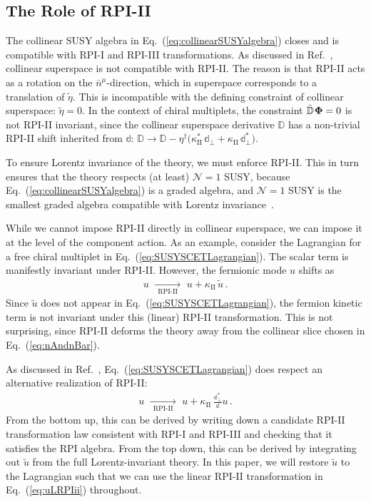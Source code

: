 \documentclass[12pt,document,nofootinbib,superscriptaddress,onecolumn,preprintnumbers,balancelastpage]{article}
\newcommand{\rpiii}{{\kappa_\text{II}}}
\newcommand{\rpiiiC}{{\kappa^*_\text{II}}}
\newcommand{\s}{\hspace{0.8pt}}
\newcommand{\PP}{\mathbb{d}}
\newcommand{\RPIii}{\,\,\xrightarrow[\hspace{5pt}\text{RPI-II}\hspace{5pt}]{}\,\,}
\DeclareRobustCommand{\Eq}[1]{Eq.~(\ref{#1})}
\DeclareRobustCommand{\Ref}[1]{Ref.~\cite{#1}}
\newcommand{\bPhi}{ \boldsymbol \Phi}
\newcommand{\D}{\mathbb{D}}
\begin{document}
\begin{spacing}{1.2}
\subsection{The Role of RPI-II}
\label{subsec:RPIIsuperspace}

The collinear SUSY algebra in \Eq{eq:collinearSUSYalgebra} closes and is compatible with RPI-I and RPI-III transformations.
%
As discussed in \Ref{Cohen:2018qvn}, collinear superspace is not compatible with RPI-II.
%
The reason is that RPI-II acts as a rotation on the $\bar{n}^\mu$-direction, which in superspace corresponds to a translation of $\tilde{\eta}$.
%
This is incompatible with the defining constraint of collinear superspace: $\tilde{\eta} =0$.
%
In the context of chiral multiplets, the constraint $\bar{ \D}\s \bPhi = 0$ is not RPI-II invariant, since the collinear superspace derivative $\D$ has a non-trivial RPI-II shift inherited from $\PP$:  $\D \to \D - \eta^\dagger \big(\rpiiiC\, \PP_\perp + \rpiii\, \PP_\perp^*\big)$.


To ensure Lorentz invariance of the theory, we must enforce RPI-II.
%
This in turn ensures that the theory respects (at least) $\mathcal{N} = 1$ SUSY, because \Eq{eq:collinearSUSYalgebra} is a graded algebra, and $\mathcal{N} = 1$ SUSY is the smallest graded algebra compatible with Lorentz invariance~\cite{Haag:1974qh}.


While we cannot impose RPI-II directly in collinear superspace, we can impose it at the level of the component action.
%
As an example, consider the Lagrangian for a free chiral multiplet in \Eq{eq:SUSYSCETLagrangian}.
%
The scalar term is manifestly invariant under RPI-II.
%
However, the fermionic mode $u$ shifts as
%
\begin{align}
\label{eq:uLRPIii}
u \RPIii  u + \rpiii \, \tilde{u}\,.
\end{align}
%
Since $\tilde{u}$ does not appear in \Eq{eq:SUSYSCETLagrangian}, the fermion kinetic term is not invariant under this (linear) RPI-II transformation.
%
This is not surprising, since RPI-II deforms the theory away from the collinear slice chosen in \Eq{eq:nAndnBar}.


As discussed in \Ref{Cohen:2018qvn}, \Eq{eq:SUSYSCETLagrangian} does respect an alternative realization of RPI-II:
%
\begin{align}
\label{eq:uNLRPIii}
u  \RPIii u + \rpiii \, \frac{\PP_\perp^*}{\PP}  u\,.
\end{align}
%
From the bottom up, this can be derived by writing down a candidate RPI-II transformation law consistent with RPI-I and RPI-III and checking that it satisfies the RPI algebra.
%
From the top down, this can be derived by integrating out $\tilde{u}$ from the full Lorentz-invariant theory.
%
In this paper, we will restore $\tilde{u}$ to the Lagrangian such that we can use the linear RPI-II transformation in \Eq{eq:uLRPIii} throughout.



\end{spacing}
\end{document}

